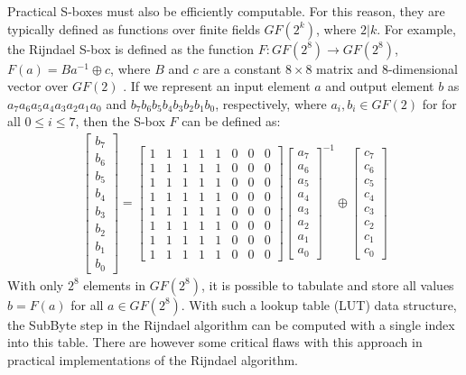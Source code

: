 Practical S-boxes must also be efficiently computable. For this reason, they are typically defined as functions
over finite fields $GF(2^k)$, where $2 | k$. For example, the Rijndael S-box 
is defined as the function $F : GF(2^8) \to GF(2^8)$, $F(a) = Ba^{-1} \oplus c$, where $B$ and
$c$ are a constant $8 \times 8$ matrix and $8$-dimensional vector over $GF(2)$ \cite{Daemen02-1}. If we represent an
input element $a$ and output element $b$ as $a_7a_6a_5a_4a_3a_2a_1a_0$ and 
$b_7b_6b_5b_4b_3b_2b_1b_0$, respectively, where $a_i,b_i \in GF(2)$ for for all 
$0 \leq i \leq 7$, then the S-box $F$ can be defined as:
\begin{align*}
\begin{bmatrix} b_7 \\ b_6 \\ b_5 \\ b_4 \\ b_3 \\ b_2 \\ b_1 \\ b_0 \end{bmatrix} = 
\begin{bmatrix} 
1 & 1 & 1 & 1 & 1 & 0 & 0 & 0 \\
1 & 1 & 1 & 1 & 1 & 0 & 0 & 0 \\
1 & 1 & 1 & 1 & 1 & 0 & 0 & 0 \\
1 & 1 & 1 & 1 & 1 & 0 & 0 & 0 \\
1 & 1 & 1 & 1 & 1 & 0 & 0 & 0 \\
1 & 1 & 1 & 1 & 1 & 0 & 0 & 0 \\
1 & 1 & 1 & 1 & 1 & 0 & 0 & 0 \\ 
1 & 1 & 1 & 1 & 1 & 0 & 0 & 0 \end{bmatrix} \begin{bmatrix} a_7 \\ a_6 \\ a_5 \\ a_4 \\ a_3 \\ a_2 \\ a_1 \\ a_0 \end{bmatrix}^{-1} \oplus
\begin{bmatrix}
c_7 \\ c_6 \\ c_5 \\ c_4 \\ c_3 \\ c_2 \\ c_1 \\ c_0
\end{bmatrix}
\end{align*}
With only $2^8$ elements in $GF(2^8)$, it is possible to tabulate and store
all values $b = F(a)$ for all $a \in GF(2^8)$. With such a lookup table (LUT) data structure, the SubByte
step in the Rijndael algorithm can be computed with a single index into this table. 
There are however some critical flaws with this approach in practical implementations
of the Rijndael algorithm.

